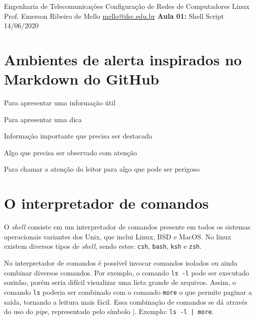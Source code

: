 \documentclass[11pt]{ifscarticle}
\begin{document}
\cabecalhoCurso%
{Engenharia de Telecomunicações} %
{Configuração de Redes de Computadores Linux} %
{Prof. Emerson Ribeiro de Mello} %
{\url{mello@ifsc.edu.br}} %
{\textbf{Aula 01:} Shell Script} %
{14/06/2020} %


\section{Ambientes de alerta inspirados no Markdown do GitHub}

\begin{note}[Nota][\faCircleInfo][notecolor]
    Para apresentar uma informação útil
\end{note}

\begin{tip}
    Para apresentar uma dica
\end{tip}

\begin{important}
    Informação importante que precisa ser destacada
\end{important}

\begin{warning}
    Algo que precisa ser observado com atenção
\end{warning}

\begin{caution}
    Para chamar a atenção do leitor para algo que pode ser perigoso
\end{caution}


\section{O interpretador de comandos}

O \textit{shell} consiste em um interpretador de comandos presente em todos os sistemas operacionais variantes dos Unix, que inclui Linux, BSD e MacOS. No linux existem diversos tipos de \textit{shell}, sendo estes: \texttt{csh}, \texttt{bash}, \texttt{ksh} e \texttt{zsh}. 

No interpretador de comandos é possível invocar comandos isolados ou ainda combinar diversos comandos. Por exemplo, o comando \texttt{ls -l} pode ser executado sozinho, porém seria difícil visualizar uma lista grande de arquivos. Assim, o comando \texttt{ls} poderia ser combinado com o comando \texttt{more} o que permite paginar a saída, tornando a leitura mais fácil. Essa combinação de comandos se dá através do uso do \textit{pipe}, representado pelo símbolo $|$. Exemplo: \texttt{ls -l | more}.
\end{document}
